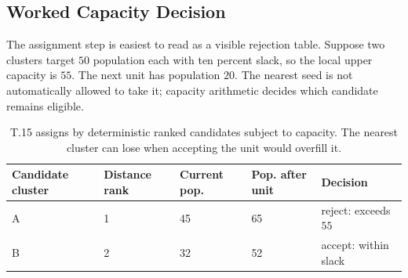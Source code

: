 \begin{table}[h]
\centering
\small
{}
\caption{Capacity-clustering status taxonomy. Repair is visible lineage, not
hidden cleanup.}
\end{table}

\subsection{Worked Capacity Decision}

The assignment step is easiest to read as a visible rejection table. Suppose two
clusters target \(50\) population each with ten percent slack, so the local upper
capacity is \(55\). The next unit has population \(20\). The nearest seed is not
automatically allowed to take it; capacity arithmetic decides which candidate
remains eligible.

\begin{table}[h]
\centering
\small
\begin{tabular}{lllll}
\toprule
Candidate cluster & Distance rank & Current pop. & Pop. after unit & Decision \\
\midrule
A & 1 & 45 & 65 & reject: exceeds \(55\) \\
B & 2 & 32 & 52 & accept: within slack \\
\bottomrule
\end{tabular}
\caption{T.15 assigns by deterministic ranked candidates subject to capacity.
The nearest cluster can lose when accepting the unit would overfill it.}
\end{table}
